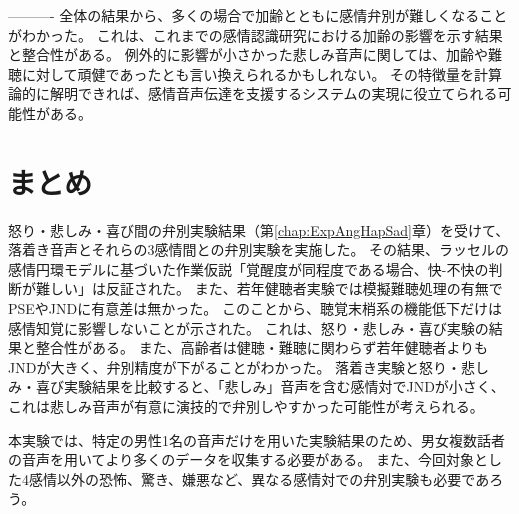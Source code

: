 ----------
全体の結果から、多くの場合で加齢とともに感情弁別が難しくなることがわかった。
これは、これまでの感情認識研究における加齢の影響を示す結果と整合性がある。
例外的に影響が小さかった悲しみ音声に関しては、加齢や難聴に対して頑健であったとも言い換えられるかもしれない。
その特徴量を計算論的に解明できれば、感情音声伝達を支援するシステムの実現に役立てられる可能性がある。





\section{まとめ}
怒り・悲しみ・喜び間の弁別実験結果（第\ref{chap:ExpAngHapSad}章）を受けて、落着き音声とそれらの3感情間との弁別実験を実施した。
その結果、ラッセルの感情円環モデルに基づいた作業仮説「覚醒度が同程度である場合、快-不快の判断が難しい」は反証された。
また、若年健聴者実験では模擬難聴処理の有無でPSEやJNDに有意差は無かった。
このことから、聴覚末梢系の機能低下だけは感情知覚に影響しないことが示された。
これは、怒り・悲しみ・喜び実験の結果と整合性がある。
また、高齢者は健聴・難聴に関わらず若年健聴者よりもJNDが大きく、弁別精度が下がることがわかった。
落着き実験と怒り・悲しみ・喜び実験結果を比較すると、「悲しみ」音声を含む感情対でJNDが小さく、
これは悲しみ音声が有意に演技的で弁別しやすかった可能性が考えられる。

本実験では、特定の男性1名の音声だけを用いた実験結果のため、男女複数話者の音声を用いてより多くのデータを収集する必要がある。
また、今回対象とした4感情以外の恐怖、驚き、嫌悪など、異なる感情対での弁別実験も必要であろう。







